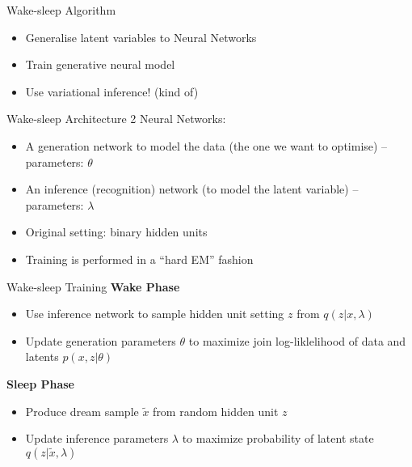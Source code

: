 
\begin{frame}{Wake-sleep Algorithm}
\begin{itemize}
\item Generalise latent variables to Neural Networks
\item Train generative neural model
\item Use variational inference! (kind of)
\end{itemize}
\end{frame}

\begin{frame}{Wake-sleep Architecture}
2 Neural Networks:
\begin{itemize}
\pause
\item A generation network to model the data (the one we want to optimise) -- parameters: $ \theta $
\pause
\item An inference (recognition) network (to model the latent variable) -- parameters: $ \lambda $
\pause
\item Original setting: binary hidden units
\pause
\item Training is performed in a ``hard EM'' fashion
\end{itemize}
\end{frame}

\begin{frame}{Wake-sleep Training}
\textbf{Wake Phase} \\
\begin{itemize}
\item Use inference network to sample hidden unit setting $ z $ from $ q(z|x,\lambda) $
\item Update generation parameters $ \theta $ to maximize join log-liklelihood of data and latents $ p(x,z|\theta) $
\end{itemize}
\pause
\textbf{Sleep Phase}
\begin{itemize}
\item Produce dream sample $ \tilde{x} $ from random hidden unit $ z $
\item Update inference parameters $ \lambda $ to maximize probability of latent state $ q(z|\tilde{x},\lambda) $
\end{itemize}
\end{frame}

